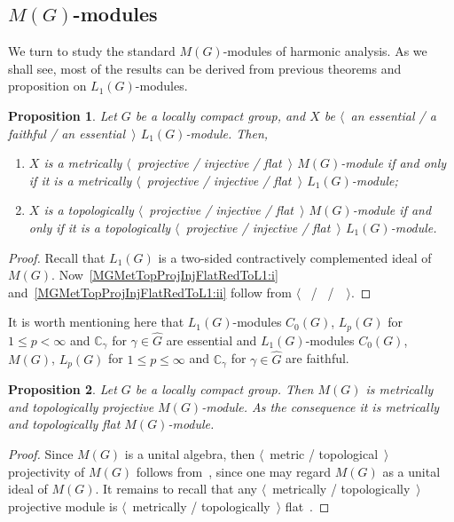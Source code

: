 \documentclass{article}
\theoremstyle{plain}
\newtheorem{proposition}{Proposition}[section]
\theoremstyle{definition}
\newtheorem{proof}{Proof}\def\theproof{}
\begin{document}
\begin{fulltext}
\section{\texorpdfstring{$M(G)$}{M (G)}-modules}\label{SubSectionMGModules}

We turn to study the standard $M(G)$-modules of harmonic analysis. As we shall
see, most of the results can be derived from previous theorems and proposition
on $L_1(G)$-modules.

\begin{proposition}\label{MGMetTopProjInjFlatRedToL1} Let $G$ be a locally
compact group, and $X$ be $\langle$~an essential / a faithful / an
essential~$\rangle$ $L_1(G)$-module. Then,
\begin{enumerate}[label = (\roman*)]
    \item $X$ is a metrically $\langle$~projective / injective / flat~$\rangle$
    $M(G)$-module if and only if it is a metrically $\langle$~projective /
    injective / flat~$\rangle$ 
    $L_1(G)$-module;\label{MGMetTopProjInjFlatRedToL1:i}
 
    \item $X$ is a topologically $\langle$~projective / injective /
    flat~$\rangle$ $M(G)$-module if and only if it is a topologically
    $\langle$~projective / injective / flat~$\rangle$ 
    $L_1(G)$-module.\label{MGMetTopProjInjFlatRedToL1:ii}
\end{enumerate}
\end{proposition}
\begin{proof} Recall that $L_1(G)$ is a two-sided contractively complemented
ideal of $M(G)$. Now~\ref{MGMetTopProjInjFlatRedToL1:i}
and~\ref{MGMetTopProjInjFlatRedToL1:ii} follow from $\langle$~\cite[proposition
2.6]{NemGeomProjInjFlatBanMod} /~\cite[proposition
2.16]{NemGeomProjInjFlatBanMod} /~\cite[proposition
2.24]{NemGeomProjInjFlatBanMod}~$\rangle$.
\end{proof} 

It is worth mentioning here that $L_1(G)$-modules $C_0(G)$, $L_p(G)$ for $1\leq
p<\infty$ and $\mathbb{C}_\gamma$ for $\gamma\in\widehat{G}$ are essential and
$L_1(G)$-modules $C_0(G)$, $M(G)$, $L_p(G)$ for $1\leq p\leq \infty$ and
$\mathbb{C}_\gamma$ for $\gamma\in\widehat{G}$ are faithful. 

\begin{proposition}\label{MGModMGMetTopProjFlatCharac} Let $G$ be a locally
compact group. Then $M(G)$ is metrically and topologically projective
$M(G)$-module. As the consequence it is metrically and topologically flat
$M(G)$-module.
\end{proposition} 
\begin{proof} Since $M(G)$ is a unital algebra, then $\langle$~metric /
topological~$\rangle$ projectivity of $M(G)$ follows from~\cite[proposition
7]{NemMetTopProjIdBanAlg}, since one may regard $M(G)$ as a unital ideal of
$M(G)$. It remains to recall that any $\langle$~metrically /
topologically~$\rangle$ projective module is $\langle$~metrically /
topologically~$\rangle$ flat~\cite[proposition 2.26]{NemGeomProjInjFlatBanMod}.
\end{proof}


\end{fulltext}
\end{document}
